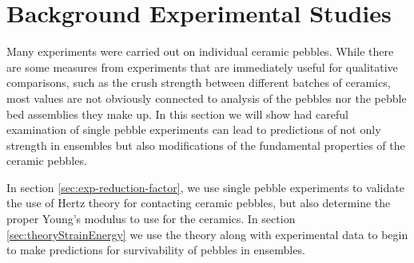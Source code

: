 \chapter{Background Experimental Studies}\label{sec:studies-experiments}

Many experiments were carried out on individual ceramic pebbles. While there are some measures from experiments that are immediately useful for qualitative comparisons, such as the crush strength between different batches of ceramics, most values are not obviously connected to analysis of the pebbles nor the pebble bed assemblies they make up. In this section we will show had careful examination of single pebble experiments can lead to predictions of not only strength in ensembles but also modifications of the fundamental properties of the ceramic pebbles.

In section \cref{sec:exp-reduction-factor}, we use single pebble experiments to validate the use of Hertz theory for contacting ceramic pebbles, but also determine the proper Young's modulus to use for the ceramics. In section \cref{sec:theoryStrainEnergy} we use the theory along with experimental data to begin to make predictions for survivability of pebbles in ensembles.











